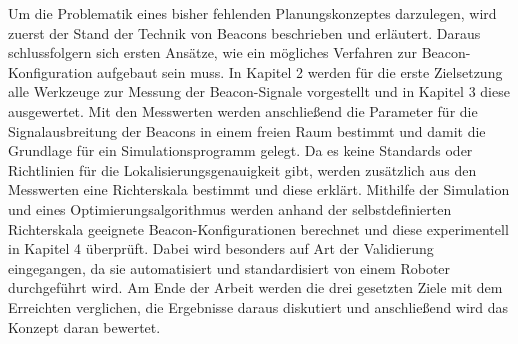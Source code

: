 Um die Problematik eines bisher fehlenden Planungskonzeptes darzulegen, wird zuerst der Stand der Technik von Beacons beschrieben und erläutert. Daraus schlussfolgern sich ersten Ansätze, wie ein mögliches Verfahren zur Beacon-Konfiguration aufgebaut sein muss. In Kapitel 2 werden für die erste Zielsetzung alle Werkzeuge zur Messung der Beacon-Signale vorgestellt und in Kapitel 3 diese ausgewertet. Mit den Messwerten werden anschließend die Parameter für die Signalausbreitung der Beacons in einem freien Raum bestimmt und damit die Grundlage für ein Simulationsprogramm gelegt. Da es keine Standards oder Richtlinien für die Lokalisierungsgenauigkeit gibt, werden zusätzlich aus den Messwerten eine Richterskala bestimmt und diese erklärt. Mithilfe der Simulation und eines Optimierungsalgorithmus werden anhand der selbstdefinierten Richterskala geeignete Beacon-Konfigurationen berechnet und diese experimentell in Kapitel 4 überprüft. Dabei wird besonders auf Art der Validierung eingegangen, da sie automatisiert und standardisiert von einem Roboter durchgeführt wird. Am Ende der Arbeit werden die drei gesetzten Ziele mit dem Erreichten verglichen, die Ergebnisse daraus diskutiert und anschließend wird das Konzept daran bewertet. 
 






%
%
%
%
%
%
%
%
